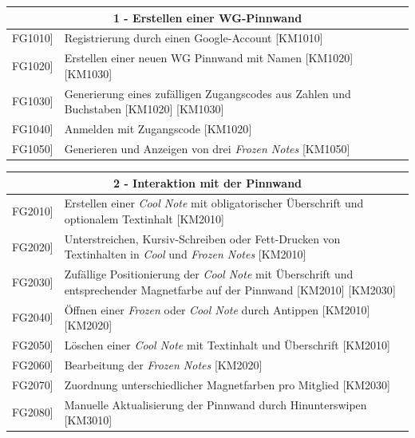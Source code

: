 \documentclass[a4paper]{scrreprt}
\begin{document}
    		\begin{table}[h!]
    			\centering
    			\label{my-label}
    			\begin{tabular}{p{2cm}p{12cm}}
    				
    				\multicolumn{2}{c}{\textbf{1 - Erstellen einer WG-Pinnwand}} \\ \hline
    				\centering{[}FG1010{]} & Registrierung durch einen Google-Account {[}KM1010{]}\\
    				\centering{[}FG1020{]}& Erstellen einer neuen WG Pinnwand mit Namen {[}KM1020{]} {[}KM1030{]}                                \\
    				\centering{[}FG1030{]}& Generierung eines zufälligen Zugangscodes aus Zahlen und Buchstaben {[}KM1020{]} {[}KM1030{]}\\ 
    				\centering{[}FG1040{]}& Anmelden mit Zugangscode {[}KM1020{]}\\ 
    				\centering{[}FG1050{]}& Generieren und Anzeigen von drei \textit{Frozen Notes} {[}KM1050{]}\\ 
    				\hline
    			\end{tabular}
    		\end{table}
    		
    		\vspace{5mm}
    		
    		\begin{table}[h!]
    			\centering
    			\label{my-label}
    			\begin{tabular}{p{2cm}p{12cm}}
    				
    				\multicolumn{2}{c}{\textbf{2 - Interaktion mit der Pinnwand}} \\ \hline
    				\centering{[}FG2010{]} & Erstellen einer \textit{Cool Note} mit obligatorischer Überschrift und optionalem Textinhalt {[}KM2010{]}\\
    				\centering{[}FG2020{]}& Unterstreichen, Kursiv-Schreiben oder Fett-Drucken von Textinhalten in \textit{Cool} und \textit{Frozen Notes} {[}KM2010{]}                              \\
    				\centering{[}FG2030{]}& Zufällige Positionierung der \textit{Cool Note} mit Überschrift und entsprechender Magnetfarbe auf der Pinnwand {[}KM2010{]} {[}KM2030{]}\\ 
    				\centering{[}FG2040{]}& Öffnen einer \textit{Frozen} oder \textit{Cool Note} durch Antippen {[}KM2010{]} {[}KM2020{]}\\ 
    				\centering{[}FG2050{]}& Löschen einer \textit{Cool Note} mit Textinhalt und Überschrift {[}KM2010{]}\\ 
    				\centering{[}FG2060{]}& Bearbeitung der \textit{Frozen Notes} {[}KM2020{]}\\ 
    				\centering{[}FG2070{]}& Zuordnung unterschiedlicher Magnetfarben pro Mitglied {[}KM2030{]}\\ 
    				\centering{[}FG2080{]}& Manuelle Aktualisierung der Pinnwand durch Hinunterswipen {[}KM3010{]}\\ 
    				\hline
    			\end{tabular}
    		\end{table}
    		
\end{document}
